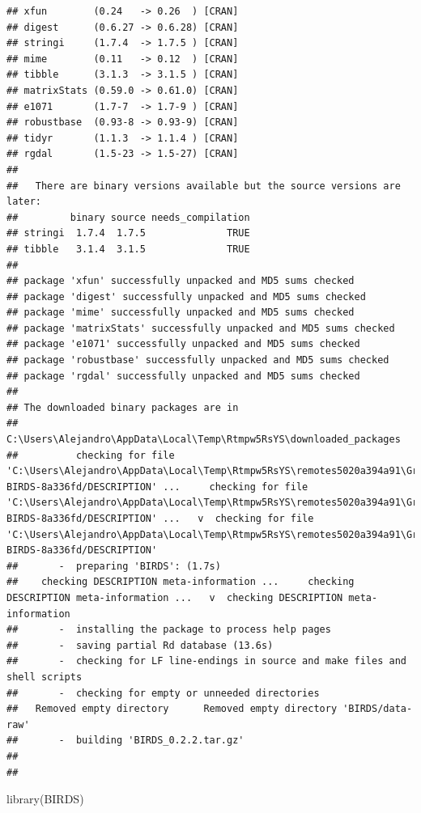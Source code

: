 \documentclass[
  10pt,
]{article}
\newenvironment{Shaded}{\begin{snugshade}}{\end{snugshade}}
\newcommand{\FunctionTok}[1]{\textcolor[rgb]{0.00,0.00,0.00}{#1}}
\newcommand{\NormalTok}[1]{#1}
\begin{document}
\begin{verbatim}
## xfun        (0.24   -> 0.26  ) [CRAN]
## digest      (0.6.27 -> 0.6.28) [CRAN]
## stringi     (1.7.4  -> 1.7.5 ) [CRAN]
## mime        (0.11   -> 0.12  ) [CRAN]
## tibble      (3.1.3  -> 3.1.5 ) [CRAN]
## matrixStats (0.59.0 -> 0.61.0) [CRAN]
## e1071       (1.7-7  -> 1.7-9 ) [CRAN]
## robustbase  (0.93-8 -> 0.93-9) [CRAN]
## tidyr       (1.1.3  -> 1.1.4 ) [CRAN]
## rgdal       (1.5-23 -> 1.5-27) [CRAN]
## 
##   There are binary versions available but the source versions are later:
##         binary source needs_compilation
## stringi  1.7.4  1.7.5              TRUE
## tibble   3.1.4  3.1.5              TRUE
## 
## package 'xfun' successfully unpacked and MD5 sums checked
## package 'digest' successfully unpacked and MD5 sums checked
## package 'mime' successfully unpacked and MD5 sums checked
## package 'matrixStats' successfully unpacked and MD5 sums checked
## package 'e1071' successfully unpacked and MD5 sums checked
## package 'robustbase' successfully unpacked and MD5 sums checked
## package 'rgdal' successfully unpacked and MD5 sums checked
## 
## The downloaded binary packages are in
##  C:\Users\Alejandro\AppData\Local\Temp\Rtmpw5RsYS\downloaded_packages
##          checking for file 'C:\Users\Alejandro\AppData\Local\Temp\Rtmpw5RsYS\remotes5020a394a91\Greensway-BIRDS-8a336fd/DESCRIPTION' ...     checking for file 'C:\Users\Alejandro\AppData\Local\Temp\Rtmpw5RsYS\remotes5020a394a91\Greensway-BIRDS-8a336fd/DESCRIPTION' ...   v  checking for file 'C:\Users\Alejandro\AppData\Local\Temp\Rtmpw5RsYS\remotes5020a394a91\Greensway-BIRDS-8a336fd/DESCRIPTION'
##       -  preparing 'BIRDS': (1.7s)
##    checking DESCRIPTION meta-information ...     checking DESCRIPTION meta-information ...   v  checking DESCRIPTION meta-information
##       -  installing the package to process help pages
##       -  saving partial Rd database (13.6s)
##       -  checking for LF line-endings in source and make files and shell scripts
##       -  checking for empty or unneeded directories
##   Removed empty directory      Removed empty directory 'BIRDS/data-raw'
##       -  building 'BIRDS_0.2.2.tar.gz'
##      
## 
\end{verbatim}

\begin{Shaded}
\begin{Highlighting}[]
\FunctionTok{library}\NormalTok{(BIRDS)}
\end{Highlighting}
\end{Shaded}
\end{document}
